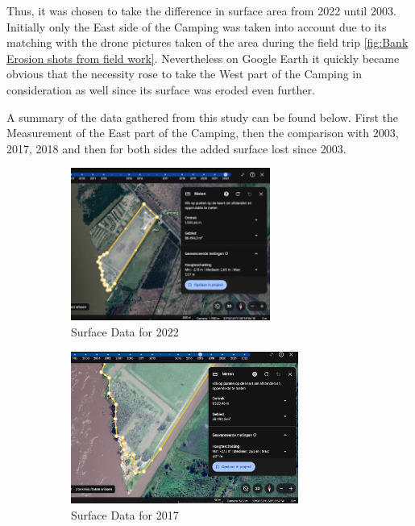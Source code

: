 Thus, it was chosen to take the difference in surface area from 2022 until 2003. Initially only the East side of the Camping was taken into account due to its matching with the drone pictures taken of the area during the field trip \ref{fig:Bank Erosion shots from field work}. Nevertheless on Google Earth it quickly became obvious that the necessity rose to take the West part of the Camping in consideration as well since its surface was eroded even further.

A summary of the data gathered from this study can be found below. First the Measurement of the East part of the Camping, then the comparison with 2003, 2017, 2018 and then for both sides the added surface lost since 2003.

\begin{figure}[H]
    \centering
    \begin{subfigure}[b]{0.45\textwidth} %
        \includegraphics[width=\linewidth, height=5cm]{figures/appendix-g/opp2022.png}
        \caption{Surface Data for 2022}
        \label{fig:surface2022.2}
    \end{subfigure}
    \hfill
    \begin{subfigure}[b]{0.45\textwidth} %
        \includegraphics[width=\linewidth, height=5cm]{figures/appendix-g/opp2017.png}
        \caption{Surface Data for 2017}
        \label{fig:surface2017}
    \end{subfigure}
    \hfill
    \begin{subfigure}[b]{0.45\textwidth} %

\end{subfigure}
\end{figure}
